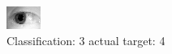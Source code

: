 \begin{figure}[h!]
\begin{center}
\includegraphics[width=0.60\columnwidth]{figures/ID1228_class_3_target_4.png}
\end{center}
\caption{ Classification: 3 actual target: 4}
\label{fig:ID1228_class_3_target_4}
\end{figure}
